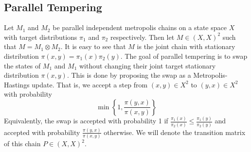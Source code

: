 \documentclass{amsart}
\newcommand{\1}{\mathbbm{1}}
\begin{document}
\subsection{Parallel Tempering}
Let $M_1$ and $M_2$ be parallel independent metropolis chains on a state space $X$ with target distributions $\pi_1$ and $\pi_2$ respectively. Then let $M\in (X,X)^2$ such that $M=M_1\otimes M_2$. It is easy to see that $M$ is the joint chain with stationary distribution $\pi(x,y)=\pi_1(x)\pi_2(y)$. The goal of parallel tempering is to swap the states of $M_1$ and $M_1$ without changing their joint target stationary distribution $\pi(x,y)$. This is done by proposing the swap as a Metropolis-Hastings update. That is, we accept a step from $(x,y)\in X^2$ to $(y,x)\in X^2$ with probability 
\begin{equation*}
    \min\left\{1,\frac{\pi(y,x)}{\pi(x,y)}\right\}
\end{equation*}
Equivalently, the swap is accepted with probability 1 if $\frac{\pi_1(x)}{\pi_2(x)}\leq \frac{\pi_1(y)}{\pi_2(y)}$ and accepted with probability $\frac{\pi(y,x)}{\pi(x,y)}$ otherwise. We will denote the transition matrix of this chain $P\in (X,X)^2$.
\end{document}
